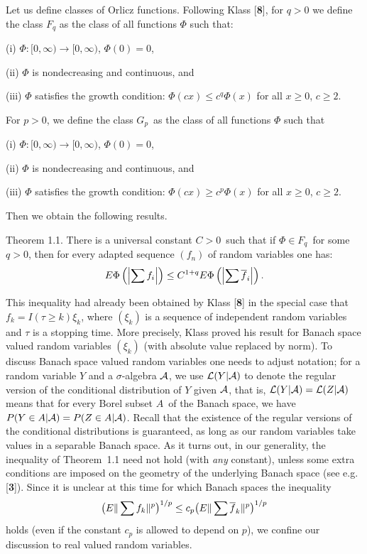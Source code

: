 Let us define classes of Orlicz functions. Following Klass [{\bf 8}], for
$q>0$ we define the class $F_q$ as the class of all functions $\Phi$ such
that: \item{(i)}
$\Phi:[0,\infty)\rightarrow[0,\infty)$, $\Phi(0)=0$, \item{(ii)} $\Phi$ is
nondecreasing and continuous, and \item{(iii)} $\Phi$ satisfies the growth
condition: $\Phi(cx)\le c^q\Phi(x)$ for all $x\ge 0$, $c\ge2$. 

\noindent For $p >0$,
we define the class $G_p$\ as the class of all functions $\Phi$ such that
\item{(i)} $\Phi:[0,\infty)\rightarrow[0,\infty)$, $\Phi(0)=0$, \item{(ii)}
$\Phi$ is nondecreasing and continuous, and \item{(iii)} $\Phi$ satisfies
the growth condition: $\Phi(cx)\ge c^p\Phi(x)$ for all $x\ge 0$, $c\ge2$. 

Then we obtain the following results.

\proclaim Theorem 1.1. There is a universal constant $C>0$\ such that if
$\Phi \in F_q$\ for some $q > 0$, then for every adapted sequence
$(f_n)$ of random variables one has:  $$ E \Phi\left(\left|\sum
f_i\right|\right) \leq C^{1+q} E \Phi\left(\left|\sum \overline f_i\right|\right).$$ 

This inequality had already been obtained by Klass [{\bf 8}] in the special
case
that $f_k=I(\tau\ge k)\xi_k$, where $(\xi_k)$ is a sequence  of
independent random variables and $\tau$ is a stopping time. More
precisely,  Klass proved his result for Banach space valued random
variables $(\xi_k)$ (with absolute value replaced by norm). To discuss 
Banach space valued random variables one needs to adjust notation; 
for a random
variable $Y$ and a $\sigma$-algebra ${\cal A}$, we use 
${\cal L}(Y |{\cal A})$ to denote the regular version of the conditional 
distribution of $Y$ given ${\cal A}$, that is, ${\cal L}(Y |{\cal A}) = 
{\cal L}(Z |{\cal A})$ means that for every Borel subset $A$\ of the 
Banach space, we 
have
$P(Y\in A|{\cal A}) = P(Z\in A|{\cal A})$. Recall that the existence of the 
regular versions of the conditional distributions is guaranteed, 
as long as our random variables take values in a separable Banach space.
As it turns out,
in our generality, the inequality of Theorem~1.1 need not hold (with
{\it any\/} constant), unless some extra  conditions are imposed 
on the geometry of the
underlying Banach space (see e.g. [{\bf 3}]). Since it is unclear
at this time for which Banach spaces the inequality $$
\big(E\|\sum f_k\|^p\big)^{1/p}\le c_p\big(E\|\sum
\overline{f}_k\|^p\big)^{1/p} $$ holds (even if the constant $c_p$ is allowed
to depend on $p$), we confine our discussion to real valued random
variables. 

